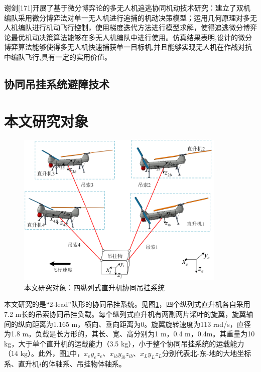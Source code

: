 谢剑[171]开展了基于微分博弈论的多无人机追逃协同机动技术研究：建立了双机编队采用微分博弈法对单一无人机进行追捕的机动决策模型；运用几何原理对多无人机编队进行机动飞行控制，使用梯度迭代方法进行模型求解，使得追逃微分博弈论最优机动决策算法能够在多无人机编队中进行使用。仿真结果表明,设计的微分博弈算法能够使得多无人机快速捕获单一目标机,并且能够实现无人机在作战对抗中编队飞行,具有一定的实用价值。

\subsection{协同吊挂系统避障技术}

\section{本文研究对象}

\begin{figure}[!htb]  
  \includegraphics[width=10cm]{fig/figure_chap4/Chap4_1_2.png}
  \caption{本文研究对象：四纵列式直升机协同吊挂系统}
  \label{fig:4_1_2}
\end{figure}

本文研究的是“2-lead”队形的协同吊挂系统。见图\ref{fig:4_1_2}，四个纵列式直升机各自采用7.2 m长的吊索协同吊挂负载。每个纵列式直升机有两副两片桨叶的旋翼，旋翼轴间的纵向距离为1.165 m，横向、垂向距离为0。旋翼旋转速度为113 rad/s，直径为1.8 m。负载是长方形的，其长、宽、高分别为1 m，0.4 m，0.4m。其重量为10 kg，大于单个直升机的运载能力（3.5 kg），小于整个协同吊挂系统的运载能力（14 kg）。此外，图\ref{fig:4_1_2}中，$x_ey_ez_e$、$x_{ib}y_{ib}z_{ib}$、$x_Ly_Lz_L$分别代表北-东-地的大地坐标系、直升机$i$的体轴系、吊挂物体轴系。

